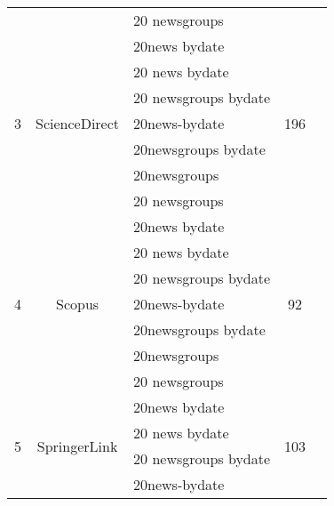 \documentclass{article}
\begin{document}
\begin{landscape}
\begin{table}[]
{\begin{tabular}{cclcccccc}
          &       & 20 newsgroups & \multicolumn{3}{c}{}  & \multicolumn{3}{c}{} \\
    \multirow{7}[0]{*}{3} & \multicolumn{1}{c}{\multirow{7}[0]{*}{ScienceDirect}} & 20news bydate & \multicolumn{3}{c}{\multirow{7}[0]{*}{196}} & \multicolumn{3}{c}{} \\
          &       & 20 news bydate & \multicolumn{3}{c}{}  & \multicolumn{3}{c}{} \\
          &       & 20 newsgroups bydate & \multicolumn{3}{c}{}  & \multicolumn{3}{c}{} \\
          &       & 20news-bydate & \multicolumn{3}{c}{}  & \multicolumn{3}{c}{} \\
          &       & 20newsgroups bydate & \multicolumn{3}{c}{}  & \multicolumn{3}{c}{} \\
          &       & 20newsgroups & \multicolumn{3}{c}{}  & \multicolumn{3}{c}{} \\
          &       & 20 newsgroups & \multicolumn{3}{c}{}  & \multicolumn{3}{c}{} \\
    \multirow{7}[0]{*}{4} & \multicolumn{1}{c}{\multirow{7}[0]{*}{Scopus}} & 20news bydate & \multicolumn{3}{c}{\multirow{7}[0]{*}{92}} & \multicolumn{3}{c}{} \\
          &       & 20 news bydate & \multicolumn{3}{c}{}  & \multicolumn{3}{c}{} \\
          &       & 20 newsgroups bydate & \multicolumn{3}{c}{}  & \multicolumn{3}{c}{} \\
          &       & 20news-bydate & \multicolumn{3}{c}{}  & \multicolumn{3}{c}{} \\
          &       & 20newsgroups bydate & \multicolumn{3}{c}{}  & \multicolumn{3}{c}{} \\
          &       & 20newsgroups & \multicolumn{3}{c}{}  & \multicolumn{3}{c}{} \\
          &       & 20 newsgroups & \multicolumn{3}{c}{}  & \multicolumn{3}{c}{} \\
    \multirow{7}[0]{*}{5} & \multicolumn{1}{c}{\multirow{7}[0]{*}{SpringerLink}} & 20news bydate & \multicolumn{3}{c}{\multirow{7}[0]{*}{103}} & \multicolumn{3}{c}{} \\
          &       & 20 news bydate & \multicolumn{3}{c}{}  & \multicolumn{3}{c}{} \\
          &       & 20 newsgroups bydate & \multicolumn{3}{c}{}  & \multicolumn{3}{c}{} \\
          &       & 20news-bydate & \multicolumn{3}{c}{}  & \multicolumn{3}{c}{} \\

\end{tabular}}
\end{table}
\end{landscape}
\end{document}
